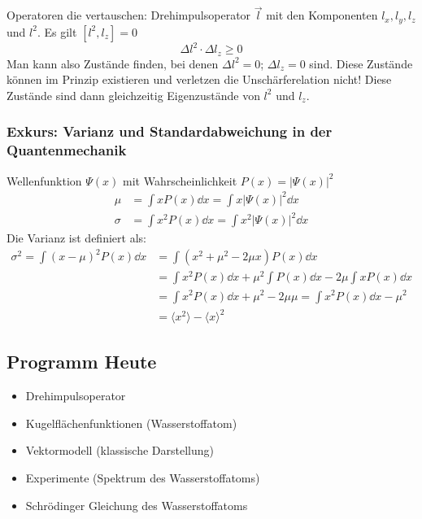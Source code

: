 Operatoren die vertauschen: Drehimpulsoperator $ \vec{l} $ mit den Komponenten $ l_x, l_y, l_z $ und $ l^2 $. Es gilt $ \left[l^2, l_z\right] = 0 $
\begin{equation*}
\Delta l^2 \cdot \Delta l_z \ge 0
\end{equation*}
Man kann also Zustände finden, bei denen $ \Delta l^2 = 0 $; $ \Delta l_z = 0 $ sind. Diese Zustände können im Prinzip existieren und verletzen die Unschärferelation nicht! Diese Zustände sind dann gleichzeitig Eigenzustände von $ l^2 $ und $ l_z $.

\subsubsection*{Exkurs: Varianz und Standardabweichung in der Quantenmechanik}

Wellenfunktion $ \Psi(x) $ mit Wahrscheinlichkeit $ P(x) = |\Psi(x)|^2 $
\begin{align*}
\mu &= \int x P(x) \dd x = \int x | \Psi(x) | ^2 \dd x \\
\sigma   &= \int x^2 P(x) \dd x = \int x^2 | \Psi(x) | ^2 \dd x
\end{align*}
Die Varianz ist definiert als:
\begin{align*}
\sigma^2 = \int (x - \mu)^2 P(x) \dd x &= \int (x^2 + \mu^2 - 2 \mu x) P(x) \dd x \\
&= \int x^2 P(x) \dd x + \mu^2 \int P(x) \dd x - 2 \mu \int x P(x) \dd x\\
&= \int x^2 P(x) \dd x + \mu^2 - 2 \mu \mu = \int x^2 P(x) \dd x - \mu^2 \\
&= \langle x ^2 \rangle - \langle x \rangle ^2
\end{align*}


\subsection{Programm Heute}

\begin{itemize}
	\item Drehimpulsoperator
	\item Kugelflächenfunktionen (Wasserstoffatom)
	\item Vektormodell (klassische Darstellung)\\
	\item Experimente (Spektrum des Wasserstoffatoms)
	\item Schrödinger Gleichung des Wasserstoffatoms
\end{itemize}

